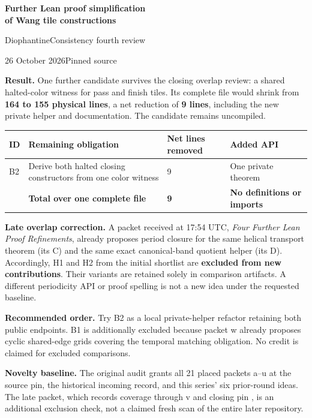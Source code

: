 {\LARGE\bfseries Further Lean proof simplification\\of Wang tile constructions\par}
\vspace{6pt}
{\large DiophantineConsistency fourth review\par}
\vspace{7pt}
26 October 2026\qquad Pinned source 

\textbf{Result.} One further candidate survives the closing overlap review: a shared halted-color witness for pass and finish tiles. Its complete file would shrink from \textbf{164 to 155 physical lines}, a net reduction of \textbf{9 lines}, including the new private helper and documentation. The candidate remains uncompiled.

\begin{tabularx}{\linewidth}{@{}L{0.38in}Y R{0.95in}L{1.2in}@{}}
\toprule
ID & Remaining obligation & Net lines removed & Added API \\
\midrule
B2 & Derive both halted closing constructors from one color witness & 9 & One private theorem \\
\midrule
 & \textbf{Total over one complete file} & \textbf{9} & \textbf{No definitions or imports} \\
\bottomrule
\end{tabularx}

\textbf{Late overlap correction.} A packet received at 17:54 UTC, \emph{Four Further Lean Proof Refinements}, already proposes period closure for the same helical transport theorem (its C) and the same exact canonical-band quotient helper (its D). Accordingly, H1 and H2 from the initial shortlist are \textbf{excluded from new contributions}. Their variants are retained solely in comparison artifacts. A different periodicity API or proof spelling is not a new idea under the requested baseline.

\textbf{Recommended order.} Try B2 as a local private-helper refactor retaining both public endpoints. B1 is additionally excluded because packet w already proposes cyclic shared-edge grids covering the temporal matching obligation. No credit is claimed for excluded comparisons.

\textbf{Novelty baseline.} The original audit grants all 21 placed packets a--u at the source pin, the historical incoming record, and this series' six prior-round ideas. The late packet, which records coverage through v and closing pin , is an additional exclusion check, not a claimed fresh scan of the entire later repository.

